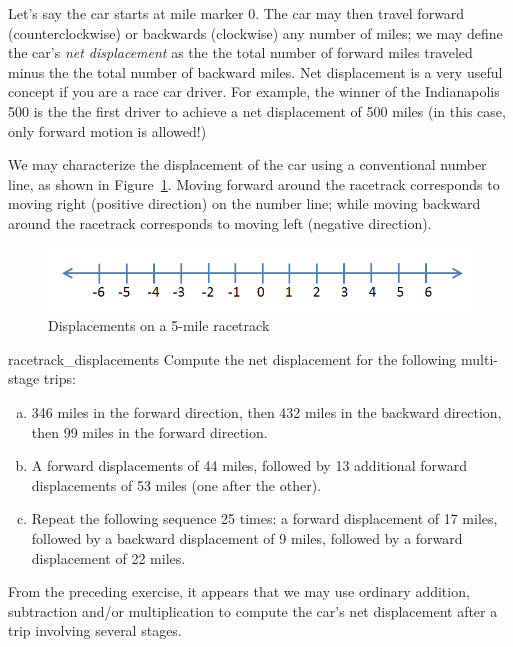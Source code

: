 Let's say the car starts at mile marker 0. The car may then travel forward (counterclockwise) or backwards (clockwise) any number of miles; we may define the car's  \emph{net displacement} as the the total number of forward miles traveled minus the the total number of backward miles. Net displacement is a very useful concept if you are a race car driver. For example, the winner of the Indianapolis 500 is the the first driver to achieve a net displacement of 500 miles (in this case, only forward motion is allowed!)

We may characterize the displacement of the car using  
a conventional number line, as shown in Figure~\ref{fig:displacement}. Moving forward around the racetrack corresponds to moving right (positive direction) on the number line; while moving backward around the racetrack corresponds to moving left (negative direction).
\begin{figure}[h]\label{fig:displacement}
\begin{center}
\includegraphics[width=4.5in]{images/integer_line.png}
\end{center}
\caption{Displacements on a 5-mile racetrack}
\end{figure}

\begin{exercise}{racetrack_displacements}
Compute the net displacement for the following multi-stage trips:
\begin{enumerate}[(a)]
\item
346 miles in the forward direction, then 432 miles in the backward direction, then 99 miles in the forward direction.
\item A forward displacements of 44 miles, followed by 13 additional forward displacements of 53 miles (one after the other).
\item Repeat the following sequence 25 times: a forward displacement  of 17 miles, followed by a backward displacement of 9 miles, followed by a forward displacement of 22 miles.
\end{enumerate}
\end{exercise}
From the preceding exercise, it appears that we may use ordinary addition, subtraction and/or multiplication to compute the car's net displacement after a trip involving several stages.

